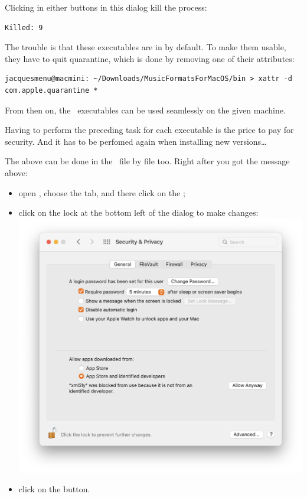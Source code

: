 Clicking in either buttons in this dialog kill the process:
\begin{lstlisting}[language=Terminal]
Killed: 9
\end{lstlisting}

The trouble is that these executables are in {\it \quarantine} by default. To make them usable, they have to quit quarantine, which is done by removing one of their attributes:
\begin{lstlisting}[language=Terminal]
jacquesmenu@macmini: ~/Downloads/MusicFormatsForMacOS/bin > xattr -d com.apple.quarantine *
\end{lstlisting}

From then on, the \mf\ executables can be used seamlessly on the given machine.

Having to perform the preceding task for each executable is the price to pay for security. And it has to be perfomed again when installing new versions\dots


The above can be done in the \GUI\ file by file too. Right after you got the message above:
\begin{itemize}
\item  open , choose the  tab, and there click on the ;

\item click on the lock at the bottom left of the dialog to make changes:\\
\includegraphics[scale=0.35]{../graphics/MacOSAllowAnyway.png}

\item click on the  button.

\end{itemize}

